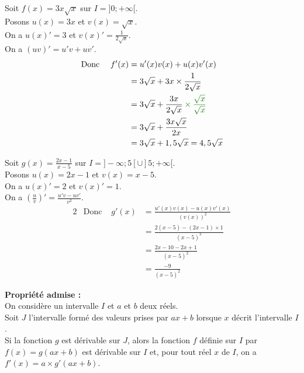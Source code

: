 \documentclass[11pt,a4paper]{article}
\begin{document}
\begin{minipage}[t]{0.5\textwidth}
    Soit $f(x)=3x\sqrt{x}$ sur $I=]0;+\infty[$. \\

    Posons $u(x)=3x$ et $v(x)=\sqrt{x}$. \\
    On a $u(x)'=3$ et $v(x)'=\frac{1}{2\sqrt{x}}$. \\
    On a $(uv)'=u'v+uv'$.
    \begin{alignat*}{2}
         & \text{Donc } & f'(x) & =u'(x)v(x)+u(x)v'(x)                                                                 \\
         &              &       & = 3\sqrt{x}+3x\times \frac{1}{2\sqrt{x}}                                             \\
         &              &       & = 3\sqrt{x}+\frac{3x}{2\sqrt{x}} \color{dark_green} \times \frac{\sqrt{x}}{\sqrt{x}} \\
         &              &       & = 3\sqrt{x}+ \frac{3x\sqrt{x}}{2x}                                                   \\
         &              &       & = 3\sqrt{x}+1,5\sqrt{x}=4,5\sqrt{x}
    \end{alignat*}
\end{minipage}
\hfill
\begin{minipage}[t]{0.5\textwidth}
    Soit $g(x)=\frac{2x-1}{x-5}$ sur $I=]-\infty; 5[\cup]5; +\infty[$. \\

    Posons $u(x)=2x-1$ et $v(x)=x-5$. \\
    On a $u(x)'=2$ et $v(x)'=1$. \\
    On a $\displaystyle\left(\frac{u}{v}\right)'=\frac{u'v-uv'}{v^2}$.
    \begin{alignat*}{2}
         & \text{Donc } & g'(x) & =\frac{u'(x)v(x)-u(x)v'(x)}{(v(x))^2} \\
         &              &       & =\frac{2(x-5)-(2x-1)\times1}{(x-5)^2} \\
         &              &       & =\frac{2x-10-2x+1}{(x-5)^2}           \\
         &              &       & =\frac{-9}{(x-5)^2}
    \end{alignat*}
\end{minipage}


\begin{mdframed}[style=proprieteStyle]
    \textbf{Propriété admise :} ~\\
    On considère un intervalle $I$ et $a$ et $b$ deux réels.\\
    Soit $J$ l'intervalle formé des valeurs prises par $ax+b$ lorsque $x$ décrit l'intervalle $I$.\\
    Si la fonction $g$ est dérivable sur $J$, alors la fonction $f$ définie sur $I$ par $f(x)=g(ax+b)$ est dérivable sur $I$ et, pour tout réel $x$ de $I$, on a $f'(x)=a\times g'(ax+b)$.
\end{mdframed}
\end{document}
